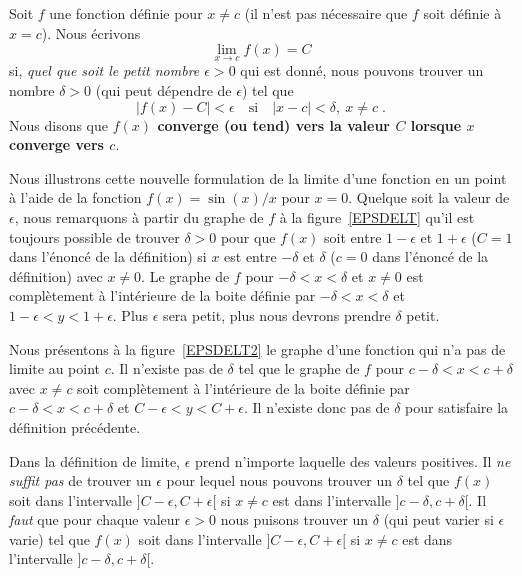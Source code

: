 {\begin{focus}{\dfn} 
Soit $f$ une fonction définie pour $x \neq c$ (il n'est pas
nécessaire que $f$ soit définie à $x=c$).  Nous écrivons
\[
\lim_{x\rightarrow c} f(x) = C
\]
si, {\em quel que soit le petit nombre $\epsilon >0$} qui est donné,
nous pouvons trouver un nombre $\delta >0$ (qui peut dépendre de
$\epsilon$) tel que
\[
| f(x) - C | < \epsilon \quad \text{si} \quad |x-c|<\delta,\ x\neq c \; .
\]
Nous disons que {\bfseries $f(x)$ converge (ou tend) vers la valeur $C$
lorsque $x$ converge vers $c$}.
\label{def2_conv}
\end{focus}


Nous illustrons cette nouvelle formulation de la limite d'une fonction
en un point à l'aide de la fonction $f(x) = \sin(x)/x$ pour $x=0$.
Quelque soit la valeur de $\epsilon$, nous remarquons à partir du graphe
de $f$ à la figure~\ref{EPSDELT} qu'il est toujours possible de trouver
$\delta>0$ pour que $f(x)$ soit entre $1-\epsilon$ et $1+\epsilon$
($C=1$ dans l'énoncé de la définition) si $x$ est entre $-\delta$ et
$\delta$ ($c=0$ dans l'énoncé de la définition) avec $x \neq 0$.  Le
graphe de $f$ pour $-\delta < x < \delta$ et $x\neq 0$ est
complètement à l'intérieure de la boite définie par
$-\delta < x < \delta$ et $1-\epsilon < y < 1+\epsilon$. 
Plus $\epsilon$ sera petit, plus nous devrons prendre $\delta$ petit.

Nous présentons à la figure~\ref{EPSDELT2} le graphe d'une fonction
qui n'a pas de limite au point $c$.  Il n'existe pas de $\delta$ tel
que le graphe de $f$ pour $c-\delta < x < c+\delta$ avec $x \neq c$
soit complètement à l'intérieure de la boite définie par 
$c-\delta < x < c+\delta$ et $C-\epsilon < y < C+\epsilon$.  Il
n'existe donc pas de $\delta$ pour satisfaire la définition
précédente.

Dans la définition de limite, $\epsilon$ prend n'importe laquelle des
valeurs positives.  Il {\em ne suffit pas} de trouver un $\epsilon$
pour lequel nous pouvons trouver un $\delta$ tel que $f(x)$ soit dans
l'intervalle $]C-\epsilon, C+\epsilon[$ si $x \neq c$ est dans
l'intervalle $]c-\delta , c+\delta[$.  Il {\em faut} que pour chaque
valeur $\epsilon>0$ nous puisons trouver un $\delta$ (qui peut varier si
$\epsilon$ varie) tel que $f(x)$ soit dans l'intervalle
$]C-\epsilon, C+\epsilon[$ si $x \neq c$ est dans l'intervalle
$]c-\delta , c+\delta[$.

}
